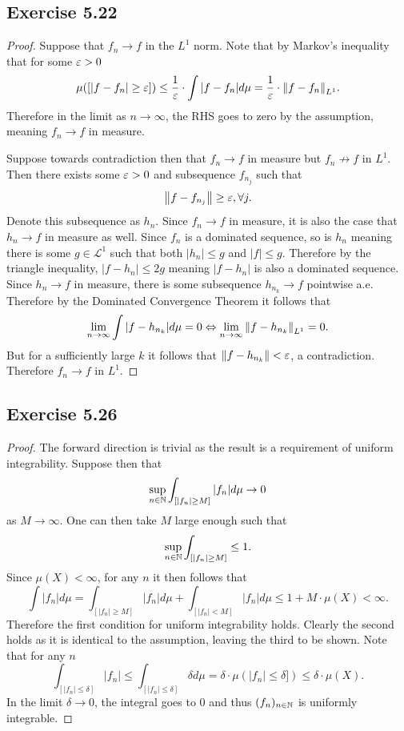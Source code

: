 \documentclass[hw_all.tex]{subfiles}
\begin{document}
\subsection{Exercise 5.22}

\begin{proof}
    Suppose that $f_n \to f$ in the $L^1$ norm. Note that by Markov's inequality that for some $\varepsilon > 0$
    \[
        \mu([|f - f_n| \geq \varepsilon]) \leq \frac{1}{\varepsilon} \cdot \int |f - f_n| d \mu = \frac{1}{\varepsilon} \cdot \norm{f - f_n}_{L^1}
    .\]
    Therefore in the limit as $n \to \infty$, the RHS goes to zero by the assumption, meaning $f_n \to f$ in measure.


    Suppose towards contradiction then that $f_n \to f$ in measure but $f_n \not\to f$ in $L^1$. Then there exists some $\varepsilon > 0$ and subsequence $f_{n_j}$ such that
    \[
        \norm{f - f_{n_j}} \geq \varepsilon, \forall j
    .\]
    Denote this subsequence as $h_n$. Since $f_n \to f$ in measure, it is also the case that $h_n \to f$ in measure as well. Since $f_n$ is a dominated sequence, so is $h_n$ meaning there is some $g \in \mathcal{L}^1$ such that both $|h_n| \leq g$ and $|f| \leq g$. Therefore by the triangle inequality, $|f - h_n| \leq 2g$ meaning $|f - h_n|$ is also a dominated sequence. Since $h_n \to f$ in measure, there is some subsequence $h_{n_k} \to f$ pointwise a.e. Therefore by the Dominated Convergence Theorem it follows that
    \[
        \lim_{n \to \infty} \int |f - h_{n_k}| d \mu = 0 \Leftrightarrow \lim_{n\to \infty} \norm{f - h_{n_k}}_{L^1} = 0
    .\]
    But for a sufficiently large $k$ it follows that $\norm{f - h_{n_k}} < \varepsilon$, a contradiction. Therefore $f_n \to f$ in $L^1$.
\end{proof}

\subsection{Exercise 5.26}

\begin{proof}
    The forward direction is trivial as the result is a requirement of uniform integrability. Suppose then that
    \[
        \sup_{n \in \mathbb{N}} \int_{[|f_n| \geq M]} |f_n| d \mu \to 0
    \]
    as $M \to \infty$. One can then take $M$ large enough such that
    \[
        \sup_{n \in \mathbb{N}} \int_{[|f_n| \geq M]} \leq 1
    .\]
    Since $\mu(X) < \infty$, for any $n$ it then follows that
    \[
        \int |f_n| d \mu = \int_{[|f_n| \geq M]} |f_n| d \mu + \int_{[|f_n| < M]} |f_n| d \mu \leq 1 + M \cdot \mu(X) < \infty
    .\]
    Therefore the first condition for uniform integrability holds. Clearly the second holds as it is identical to the assumption, leaving the third to be shown. Note that for any $n$
    \[
        \int_{[|f_n| \leq \delta]} |f_n| \leq \int_{[|f_n| \leq \delta]} \delta d \mu = \delta \cdot \mu(|f_n| \leq \delta]) \leq \delta \cdot \mu(X)
    .\]
    In the limit $\delta \to 0$, the integral goes to $0$ and thus $(f_n)_{n \in \mathbb{N}}$ is uniformly integrable.
\end{proof}
\end{document}
